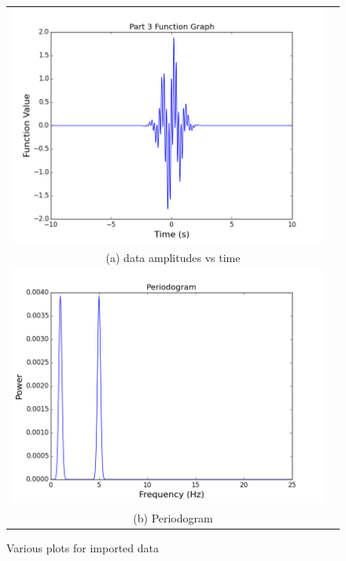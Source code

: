 \documentclass[11pt]{article}
\begin{document}
\begin{figure}[H]
\centering
\begin{tabular}{cc}
\includegraphics[scale=.4]{prt3_function.png} \\
\multicolumn{2}{c}{(a) data amplitudes vs time} \\[6pt]

\includegraphics[scale=.4]{prt3_periodogram.png}\\
\multicolumn{2}{c}{(b) Periodogram} \\[6pt]

\end{tabular}
\caption{Various plots for imported data}
\end{figure}
\end{document}
